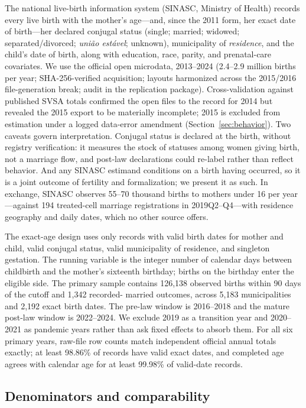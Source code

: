 \documentclass[12pt]{article}
\begin{document}
The national live-birth information system (SINASC, Ministry of Health) records every
live birth with the mother's age---and, since the 2011 form, her exact date of
birth---her declared conjugal status (single; married; widowed; separated/divorced;
\emph{uni\~ao est\'avel}; unknown), municipality of \emph{residence}, and the child's
date of birth, along with education, race, parity, and prenatal-care covariates. We use
the official open microdata, 2013--2024 (2.4--2.9 million births per year;
SHA-256-verified acquisition; layouts harmonized across the 2015/2016 file-generation
break; audit in the replication package). Cross-validation against published SVSA
totals confirmed the open files to the record for 2014 but revealed the 2015 export to
be materially incomplete; 2015 is excluded from estimation under a logged data-error
amendment (Section~\ref{sec:behavior}). Two caveats govern interpretation. Conjugal
status is declared at the birth, without registry verification: it measures the stock of
statuses among women giving birth, not a marriage flow, and post-law declarations could
re-label rather than reflect behavior. And any SINASC estimand conditions on a birth
having occurred, so it is a joint outcome of fertility and formalization; we present it
as such. In exchange, SINASC observes 55--70 thousand births to mothers under 16 per
year---against 194 treated-cell marriage registrations in 2019Q2--Q4---with residence
geography and daily dates, which no other source offers.

The exact-age design uses only records with valid birth dates for mother and child,
valid conjugal status, valid municipality of residence, and singleton gestation. The
running variable is the integer number of calendar days between childbirth and the
mother's sixteenth birthday; births on the birthday enter the eligible side. The primary
sample contains 126,138 observed births within 90 days of the cutoff and 1,342 recorded-
married outcomes, across 5,183 municipalities and 2,192 exact birth dates. The pre-law
window is 2016--2018 and the mature post-law window is 2022--2024. We exclude 2019 as a
transition year and 2020--2021 as pandemic years rather than ask fixed effects to absorb
them. For all six primary years, raw-file row counts match independent official annual
totals exactly; at least 98.86\% of records have valid exact dates, and completed age
agrees with calendar age for at least 99.98\% of valid-date records.

\subsection{Denominators and comparability}
\end{document}

